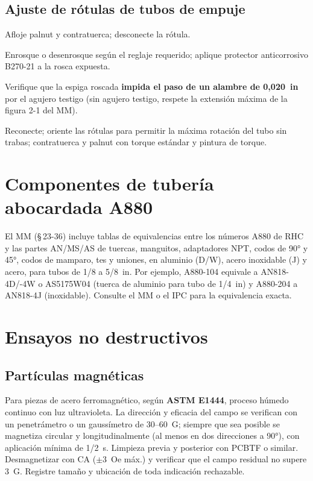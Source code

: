 \subsection{Ajuste de rótulas de tubos de empuje}

\begin{pasos}
\item Afloje palnut y contratuerca; desconecte la rótula.
\item Enrosque o desenrosque según el reglaje requerido; aplique protector anticorrosivo B270-21 a la rosca expuesta.
\item Verifique que la espiga roscada \textbf{impida el paso de un alambre de 0,020~in} por el agujero testigo (sin agujero testigo, respete la extensión máxima de la figura 2-1 del MM).
\item Reconecte; oriente las rótulas para permitir la máxima rotación del tubo sin trabas; contratuerca y palnut con torque estándar y pintura de torque.
\end{pasos}

\section{Componentes de tubería abocardada A880}

El MM (\S\,23-36) incluye tablas de equivalencias entre los números A880 de RHC y las partes AN/MS/AS de tuercas, manguitos, adaptadores NPT, codos de 90° y 45°, codos de mamparo, tes y uniones, en aluminio (D/W), acero inoxidable (J) y acero, para tubos de 1/8 a 5/8~in. Por ejemplo, A880-104 equivale a AN818-4D/-4W o AS5175W04 (tuerca de aluminio para tubo de 1/4~in) y A880-204 a AN818-4J (inoxidable). Consulte el MM o el IPC para la equivalencia exacta.

\section{Ensayos no destructivos}

\subsection{Partículas magnéticas}

Para piezas de acero ferromagnético, según \textbf{ASTM E1444}, proceso húmedo continuo con luz ultravioleta. La dirección y eficacia del campo se verifican con un penetrámetro o un gaussímetro de 30--60~G; siempre que sea posible se magnetiza circular y longitudinalmente (al menos en dos direcciones a 90°), con aplicación mínima de 1/2~s. Limpieza previa y posterior con PCBTF o similar. Desmagnetizar con CA ($\pm$3~Oe máx.) y verificar que el campo residual no supere 3~G. Registre tamaño y ubicación de toda indicación rechazable.

